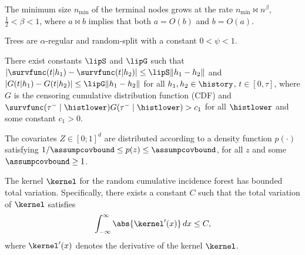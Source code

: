 \begin{assumption}
\label{assump:Cho1}
The minimum size \( n_{\text{min}} \) of the terminal nodes grows at the rate \( n_{\text{min}} \bowtie n^\beta \), \( \frac{1}{2} < \beta < 1 \), where \( a \bowtie b \) implies that both \( a = O(b) \) and \( b = O(a) \).
\end{assumption}

\begin{assumption}
\label{assump:Cho2}
Trees are \( \alpha \)-regular and random-split with a constant \( 0 < \psi < 1 \).
\end{assumption}

\begin{assumption}
\label{assump:Cho3}
There exist constants \( \lipS \) and \( \lipG \) such that \( |\survfunc(t | h_1) - \survfunc(t | h_2)| \leq \lipS\|h_1 - h_2\| \) and \( |G(t | h_1) - G(t | h_2)| \leq \lipG \|h_1 - h_2\| \) for all \( h_1, h_2 \in \history \), \( t \in [0, \tau] \), where \( G \) is the censoring cumulative distribution function (CDF) and \( \survfunc(\tau^- \mid \histlower)G(\tau^- \mid \histlower) > c_1 \) for all \( \histlower \) and some constant \( c_1 > 0 \).
\end{assumption}

%
\begin{assumption}
    \label{assump:CuiAssump2}
    The covariates $Z \in [0; 1]^d$ are distributed according to a density function $p(\cdot)$ satisfying $1/\assumpcovbound \leq p(z) \leq \assumpcovbound$, for all $z$ and some $\assumpcovbound \geq 1$.
\end{assumption}

\begin{assumption}
\label{khbddtv}
The kernel \( \kernel \) for the random cumulative incidence forest has bounded total variation. Specifically, there exists a constant \( C \) such that the total variation of \( \kernel \) satisfies
\[
\int_{-\infty}^{\infty} \abs{\kernel^\prime(x)} \, dx \leq C,
\]
where \( \kernel^\prime(x) \) denotes the derivative of the kernel \( \kernel \).
\end{assumption}